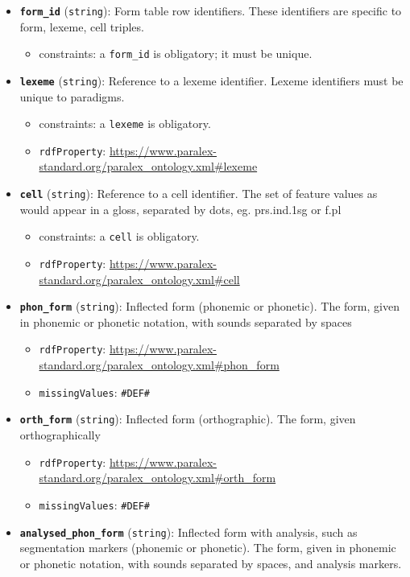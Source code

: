 \begin{itemize}
\item
  \textbf{\texttt{form\_id}} (\texttt{string}): Form table row
  identifiers. These identifiers are specific to form, lexeme, cell
  triples.

  \begin{itemize}
  \tightlist
  \item
    constraints: a \texttt{form\_id} is obligatory; it must be unique.
  \end{itemize}
\item
  \textbf{\texttt{lexeme}} (\texttt{string}): Reference to a lexeme
  identifier. Lexeme identifiers must be unique to paradigms.

  \begin{itemize}
  \item
    constraints: a \texttt{lexeme} is obligatory.
  \item
    \texttt{rdfProperty}:
    \url{https://www.paralex-standard.org/paralex_ontology.xml\#lexeme}
  \end{itemize}
\item
  \textbf{\texttt{cell}} (\texttt{string}): Reference to a cell
  identifier. The set of feature values as would appear in a gloss,
  separated by dots, eg. prs.ind.1sg or f.pl

  \begin{itemize}
  \item
    constraints: a \texttt{cell} is obligatory.
  \item
    \texttt{rdfProperty}:
    \url{https://www.paralex-standard.org/paralex_ontology.xml\#cell}
  \end{itemize}
\item
  \textbf{\texttt{phon\_form}} (\texttt{string}): Inflected form
  (phonemic or phonetic). The form, given in phonemic or phonetic
  notation, with sounds separated by spaces

  \begin{itemize}
  \tightlist
  \item
    \texttt{rdfProperty}:
    \url{https://www.paralex-standard.org/paralex_ontology.xml\#phon_form}
  \item
    \texttt{missingValues}: \texttt{\#DEF\#}
  \end{itemize}
\item
  \textbf{\texttt{orth\_form}} (\texttt{string}): Inflected form
  (orthographic). The form, given orthographically

  \begin{itemize}
  \tightlist
  \item
    \texttt{rdfProperty}:
    \url{https://www.paralex-standard.org/paralex_ontology.xml\#orth_form}
  \item
    \texttt{missingValues}: \texttt{\#DEF\#}
  \end{itemize}
\item
  \textbf{\texttt{analysed\_phon\_form}} (\texttt{string}): Inflected
  form with analysis, such as segmentation markers (phonemic or
  phonetic). The form, given in phonemic or phonetic notation, with
  sounds separated by spaces, and analysis markers.


\end{itemize}
